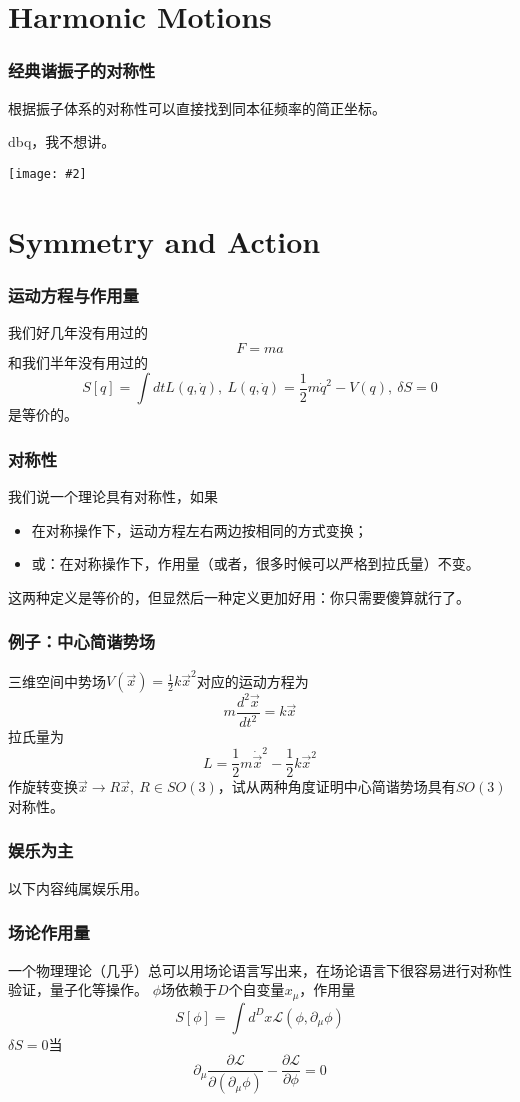 \documentclass[CJK]{beamer}
\newcommand{\cpic}[2]{
\begin{center}
\texttt{[image: \#2]}
\end{center}
}
\begin{document}
\section{Harmonic Motions}
\begin{frame}
\frametitle{\bch 经典谐振子的对称性 \ech}
\bch
根据振子体系的对称性可以直接找到同本征频率的简正坐标。
\par
dbq，我不想讲。
\cpic{0.6}{self}
\ech
\end{frame}

\section{Symmetry and Action}
\begin{frame}
\frametitle{\bch 运动方程与作用量 \ech}
\bch
我们好几年没有用过的
$$F = ma$$
和我们半年没有用过的
$$
S[q] = \int dt L(q,\dot{q}) ,\ L(q,\dot{q}) = \frac{1}{2}m\dot{q}^2 - V(q),\ \delta S = 0
$$
是等价的。
\ech
\end{frame}

\begin{frame}
\frametitle{\bch 对称性 \ech}
\bch
我们说一个理论具有对称性，如果
\begin{itemize}
\item 在对称操作下，运动方程左右两边按相同的方式变换；
\item 或：在对称操作下，作用量（或者，很多时候可以严格到拉氏量）不变。
\end{itemize}
这两种定义是等价的，但显然后一种定义更加好用：你只需要傻算就行了。
\ech
\end{frame}

\begin{frame}
\frametitle{\bch 例子：中心简谐势场 \ech}
\bch
三维空间中势场$V(\vec x ) = \frac{1}{2}k \vec x^2$对应的运动方程为
$$
m \frac{d^2 \vec x}{dt^2} = k \vec x
$$
拉氏量为
$$
L = \frac{1}{2} m \dot{\vec x}^2 - \frac{1}{2}k \vec x^2
$$
作旋转变换$\vec x \to R \vec x,\ R \in SO(3)$，试从两种角度证明中心简谐势场具有$SO(3)$对称性。
\ech
\end{frame}

\begin{frame}
\frametitle{\bch 娱乐为主 \ech}
\bch
{\LARGE 以下内容纯属娱乐用。}

\ech
\end{frame}

\begin{frame}
\frametitle{\bch 场论作用量 \ech}
\bch
一个物理理论（几乎）总可以用场论语言写出来，在场论语言下很容易进行对称性验证，量子化等操作。
$\phi$场依赖于$D$个自变量$x_\mu$，作用量
$$S[\phi] = \int d^D x \mathcal{L} (\phi,\partial_\mu \phi)$$
$\delta S = 0$当$$\partial_\mu \frac{\partial \mathcal{L}}{\partial (\partial_\mu \phi)} - \frac{\partial \mathcal{L}}{\partial \phi} = 0$$

\ech
\end{frame}
\end{document}
